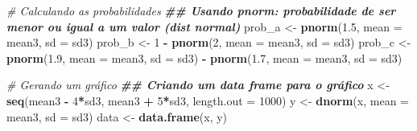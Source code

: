 \documentclass[
]{article}
\newenvironment{Shaded}{\begin{snugshade}}{\end{snugshade}}
\newcommand{\AttributeTok}[1]{\textcolor[rgb]{0.13,0.29,0.53}{#1}}
\newcommand{\CommentTok}[1]{\textcolor[rgb]{0.56,0.35,0.01}{\textit{#1}}}
\newcommand{\DecValTok}[1]{\textcolor[rgb]{0.00,0.00,0.81}{#1}}
\newcommand{\DocumentationTok}[1]{\textcolor[rgb]{0.56,0.35,0.01}{\textbf{\textit{#1}}}}
\newcommand{\FloatTok}[1]{\textcolor[rgb]{0.00,0.00,0.81}{#1}}
\newcommand{\FunctionTok}[1]{\textcolor[rgb]{0.13,0.29,0.53}{\textbf{#1}}}
\newcommand{\NormalTok}[1]{#1}
\newcommand{\OtherTok}[1]{\textcolor[rgb]{0.56,0.35,0.01}{#1}}
\newcommand{\SpecialCharTok}[1]{\textcolor[rgb]{0.81,0.36,0.00}{\textbf{#1}}}
\begin{document}
\begin{Shaded}
\begin{Highlighting}[]
\CommentTok{\# Calculando as probabilidades }
\DocumentationTok{\#\# Usando \textquotesingle{}pnorm\textquotesingle{}: probabilidade de ser menor ou igual a um valor (dist normal)}
\NormalTok{prob\_a }\OtherTok{\textless{}{-}} \FunctionTok{pnorm}\NormalTok{(}\FloatTok{1.5}\NormalTok{, }\AttributeTok{mean =}\NormalTok{ mean3, }\AttributeTok{sd =}\NormalTok{ sd3)}
\NormalTok{prob\_b }\OtherTok{\textless{}{-}} \DecValTok{1} \SpecialCharTok{{-}} \FunctionTok{pnorm}\NormalTok{(}\DecValTok{2}\NormalTok{, }\AttributeTok{mean =}\NormalTok{ mean3, }\AttributeTok{sd =}\NormalTok{ sd3)}
\NormalTok{prob\_c }\OtherTok{\textless{}{-}} \FunctionTok{pnorm}\NormalTok{(}\FloatTok{1.9}\NormalTok{, }\AttributeTok{mean =}\NormalTok{ mean3, }\AttributeTok{sd =}\NormalTok{ sd3) }\SpecialCharTok{{-}} \FunctionTok{pnorm}\NormalTok{(}\FloatTok{1.7}\NormalTok{, }\AttributeTok{mean =}\NormalTok{ mean3, }\AttributeTok{sd =}\NormalTok{ sd3)}

\CommentTok{\# Gerando um gráfico}
\DocumentationTok{\#\# Criando um data frame para o gráfico}
\NormalTok{x }\OtherTok{\textless{}{-}} \FunctionTok{seq}\NormalTok{(mean3 }\SpecialCharTok{{-}} \DecValTok{4}\SpecialCharTok{*}\NormalTok{sd3, mean3 }\SpecialCharTok{+} \DecValTok{5}\SpecialCharTok{*}\NormalTok{sd3, }\AttributeTok{length.out =} \DecValTok{1000}\NormalTok{)}
\NormalTok{y }\OtherTok{\textless{}{-}} \FunctionTok{dnorm}\NormalTok{(x, }\AttributeTok{mean =}\NormalTok{ mean3, }\AttributeTok{sd =}\NormalTok{ sd3)}
\NormalTok{data }\OtherTok{\textless{}{-}} \FunctionTok{data.frame}\NormalTok{(x, y)}


\end{Highlighting}
\end{Shaded}
\end{document}
